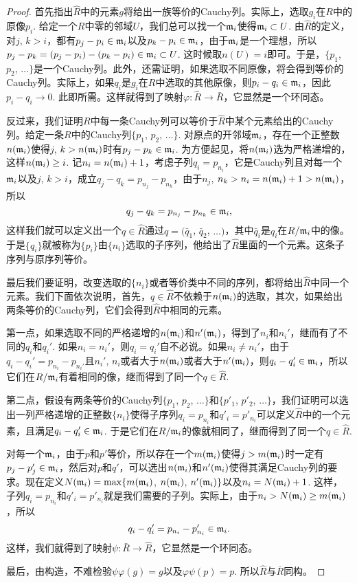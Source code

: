 \begin{proof}
	首先指出$\hat R$中的元素$g$将给出一族等价的Cauchy列。实际上，选取$g_i$在$R$中的原像$p_i$. 给定一个$R$中零的邻域$U$，我们总可以找一个$\mathfrak{m}_i$使得$\mathfrak{m}_i\subset U$. 由$\hat R$的定义，对$j$, $k>i$，都有$p_j-p_i\in \mathfrak{m}_i$以及$p_k-p_i \in \mathfrak{m}_i$，由于$\mathfrak{m}_i$是一个理想，所以$p_j-p_k=(p_j-p_i)-(p_k-p_i)\in \mathfrak{m}_i\subset U$. 这时候取$n(U)=i$即可。于是，$\{p_1$, $p_2$, $\dots\}$是一个Cauchy列。此外，还需证明，如果选取不同原像，将会得到等价的Cauchy列。实际上，如果$q_i$是$g_i$在$R$中选取的其他原像，则$p_i-q_i\in \mathfrak{m}_i$，因此$p_i-q_i\to 0$. 此即所需。这样就得到了映射$\varphi:\hat{R}\to \bar{R}$，它显然是一个环同态。

	反过来，我们证明$R$中每一条Cauchy列可以等价于$\hat R$中某个元素给出的Cauchy列。给定一条$R$中的Cauchy列$\{p_1$, $p_2$, $\dots\}$. 对原点的开邻域$\mathfrak{m}_i$，存在一个正整数$n(\mathfrak{m}_i)$使得$j$, $k>n(\mathfrak{m}_i)$时有$p_j-p_k\in \mathfrak{m}_i$. 为方便起见，将$n(\mathfrak{m}_i)$选为严格递增的，这样$n(\mathfrak{m}_i)\geq i$. 记$n_i=n(\mathfrak{m}_i)+1$，考虑子列$q_i=p_{n_i}$，它是Cauchy列且对每一个$\mathfrak{m}_i$以及$j$, $k>i$，成立$q_j-q_k=p_{n_j}-p_{n_k}$，由于$n_j$, $n_k>n_i=n(\mathfrak{m}_i)+1>n(\mathfrak{m}_i)$，所以
	\[
		q_j-q_k=p_{n_j}-p_{n_k}\in \mathfrak{m}_i,
	\]
	这样我们就可以定义出一个$q\in \hat R$通过$q=(\bar{q}_1$, $\bar{q}_2$, $\dots)$，其中$\bar{q}_i$是$q_i$在$R/\mathfrak{m}_i$中的像。于是$\{q_i\}$就被称为$\{p_i\}$由$\{n_i\}$选取的子序列，他给出了$\hat R$里面的一个元素。这条子序列与原序列等价。

	最后我们要证明，改变选取的$\{n_i\}$或者等价类中不同的序列，都将给出$\hat R$中同一个元素。我们下面依次说明，首先，$q\in \hat R$不依赖于$n(\mathfrak{m}_i)$的选取，其次，如果给出两条等价的Cauchy列，它们会得到$\hat R$中相同的元素。

	第一点，如果选取不同的严格递增的$n(\mathfrak{m}_i)$和$n'(\mathfrak{m}_i)$，得到了$n_i$和$n_i'$，继而有了不同的$q_i$和$q_i'$. 如果$n_i=n_i'$，则$q_i=q_i'$自不必说。如果$n_i\neq n_i'$，由于$q_i-q_i'=p_{n_i}-p_{n_i'}$且$n_i'$, $n_i$或者大于$n(\mathfrak{m}_i)$或者大于$n'(\mathfrak{m}_i)$，则$q_i-q_i'\in \mathfrak{m}_i$，所以它们在$R/\mathfrak{m}_i$有着相同的像，继而得到了同一个$q\in\hat R$.

	第二点，假设有两条等价的Cauchy列$\{p_1$, $p_2$, $\dots\}$和$\{p'_1$, $p'_2$, $\dots\}$，我们证明可以选出一列严格递增的正整数$\{n_i\}$使得子序列$q_i=p_{n_i}$和$q'_i=p'_{n_i}$可以定义$\hat R$中的一个元素，且满足$q_i-q_i'\in \mathfrak{m}_i$. 于是它们在$R/\mathfrak{m}_i$的像就相同了，继而得到了同一个$q\in\hat R$.

	对每一个$\mathfrak{m}_i$，由于$p$和$p'$等价，所以存在一个$m(\mathfrak{m}_i)$使得$j>m(\mathfrak{m}_i)$时一定有$p_j-p'_j\in \mathfrak{m}_i$，然后对$p$和$q'$，可以选出$n(\mathfrak{m}_i)$和$n'(\mathfrak{m}_i)$使得其满足Cauchy列的要求。现在定义$N(\mathfrak{m}_i)=\max\{m(\mathfrak{m}_i)$, $n(\mathfrak{m}_i)$, $n'(\mathfrak{m}_i)\}$以及$n_i=N(\mathfrak{m}_i)+1$. 这样，子列$q_i=p_{n_i}$和$q'_i=p'_{n_i}$就是我们需要的子列。实际上，由于$n_i>N(\mathfrak{m}_i)\geq m(\mathfrak{m}_i)$，所以
	\[
		q_i-q'_i=p_{n_i}-p'_{n_i}\in \mathfrak{m}_i.
	\]
	这样，我们就得到了映射$\psi:\bar{R}\to \hat{R}$，它显然是一个环同态。

	最后，由构造，不难检验$\psi\varphi(g)=g$以及$\varphi\psi(p)=p$. 所以$\hat R$与$\bar R$同构。
\end{proof}

